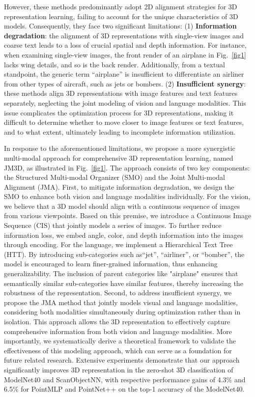 \documentclass[sigconf]{acmart}
\begin{document}
However, these methods predominantly adopt 2D alignment strategies for 3D representation learning, failing to account for the unique characteristics of 3D models. Consequently, they face two significant limitations: (1) \textbf{Information degradation}: the alignment of 3D representations with single-view images and coarse text leads to a loss of crucial spatial and depth information. For instance, when examining single-view images, the front render of an airplane in Fig.~\ref{fig1} lacks wing details, and so is the back render. Additionally, from a textual standpoint, the generic term ``airplane'' is insufficient to differentiate an airliner from other types of aircraft, such as jets or bombers. (2) \textbf{Insufficient synergy}:  these methods align 3D representations with image features and text features separately, neglecting the joint modeling of vision and language modalities. This issue complicates the optimization process for 3D representations, making it difficult to determine whether to move closer to image features or text features, and to what extent, ultimately leading to incomplete information utilization.


In response to the aforementioned limitations, we propose a more synergistic multi-modal approach for comprehensive 3D representation learning, named JM3D, as illustrated in Fig.~\ref{fig1}. The approach consists of two key components: the Structured Multi-modal Organizer (SMO) and the Joint Multi-modal Alignment (JMA). 
First, to mitigate information degradation, we design the SMO to enhance both vision and language modalities individually. For the vision, we believe that a 3D model should align with a continuous sequence of images from various viewpoints. Based on this premise, we introduce a Continuous Image Sequence (CIS) that jointly models a series of images. To further reduce information loss, we embed angle, color, and depth information into the images through encoding. For the language, we implement a Hierarchical Text Tree (HTT). By introducing sub-categories such as``jet'', ``airliner'', or ``bomber'', the model is encouraged to learn finer-grained information, thus enhancing generalizability. The inclusion of parent categories like "airplane" ensures that semantically similar sub-categories have similar features, thereby increasing the robustness of the representation.
Second, to address insufficient synergy, we propose the JMA method that jointly models visual and language modalities, considering both modalities simultaneously during optimization rather than in isolation. This approach allows the 3D representation to effectively capture comprehensive information from both vision and language modalities. More importantly, we systematically derive a theoretical framework to validate the effectiveness of this modeling approach, which can serve as a foundation for future related research. Extensive experiments demonstrate that our approach significantly improves 3D representation in the zero-shot 3D classification of ModelNet40 and ScanObjectNN, with respective performance gains of {\color{black}4.3}\% and {\color{black}6.5}\% for PointMLP and PointNet++ on the top-1 accuracy of the ModelNet40.
\end{document}

